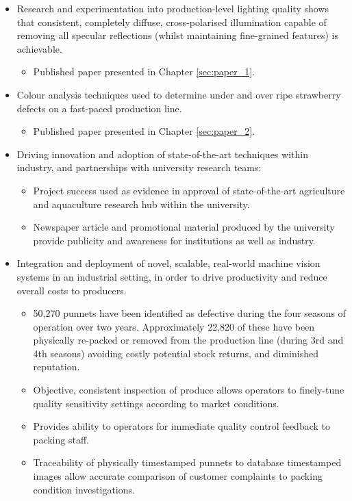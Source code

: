 \documentclass[fleqn,twoside,12pt]{report}
\begin{document}
\begin{itemize}
	\item Research and experimentation into production-level lighting quality shows that consistent, completely diffuse, cross-polarised illumination capable of removing all specular reflections (whilst maintaining fine-grained features) is achievable.
	\begin{itemize}
		\item Published paper presented in Chapter \ref{sec:paper_1}.
	\end{itemize} 
	\item Colour analysis techniques used to determine under and over ripe strawberry defects on a fast-paced production line.
	\begin{itemize}
		\item Published paper presented in Chapter \ref{sec:paper_2}.
	\end{itemize}
	\item Driving innovation and adoption of state-of-the-art techniques within industry, and partnerships with university research teams:
	\begin{itemize}
		\item Project success used as evidence in approval of state-of-the-art agriculture and aquaculture research hub within the university. 
		\item Newspaper article and promotional material produced by the university provide publicity and awareness for institutions as well as industry. 
	\end{itemize}
	\item Integration and deployment of novel, scalable, real-world machine vision systems in an industrial setting, in order to drive productivity and reduce overall costs to producers.
	\begin{itemize}
		\item 50,270 punnets have been identified as defective during the four seasons of operation over two years. Approximately 22,820 of these have been physically re-packed or removed from the production line (during 3rd and 4th seasons) avoiding costly potential stock returns, and diminished reputation.
		\item Objective, consistent inspection of produce allows operators to finely-tune quality sensitivity settings according to market conditions.
		\item Provides ability to operators for immediate quality control feedback to packing staff.
		\item Traceability of physically timestamped punnets to database timestamped images allow accurate comparison of customer complaints to packing condition investigations.  

\end{itemize}
\end{itemize}
\end{document}
